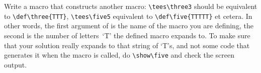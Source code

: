 Write a macro that constructs another macro: \verb+\tees\three3+
should be equivalent to \verb+\def\three{TTT}+, \verb+\tees\five5+
equivalent to \verb+\def\five{TTTTT}+ et cetera. In other words, the
first argument of  is the name of the macro you are defining,
the second is the number of letters~`T' the defined macro expands to.
To make sure that your solution really expands to that string of `T's,
and not some code that generates it when the macro is called,
do \verb+\show\five+ and check the screen output.
